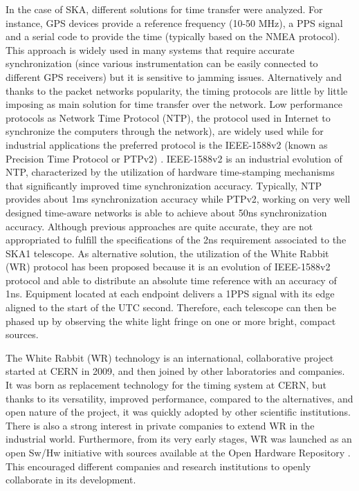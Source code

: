 In the case of SKA, different solutions for time transfer were analyzed. For instance, GPS devices provide a reference frequency (10-50 MHz), a PPS signal and a serial code to provide the time (typically based on the NMEA protocol). This approach is widely used in many systems that require accurate synchronization (since various instrumentation can be easily connected to different GPS receivers) but it is sensitive to jamming issues. Alternatively and thanks to the packet networks popularity, the timing protocols are little by little imposing as main solution for time transfer over the network. Low performance protocols as Network Time Protocol (NTP), the protocol used in Internet to synchronize the computers through the network), \cite{ntf:ntp_std} are widely used while for industrial applications the preferred protocol is the IEEE-1588v2 (known as Precision Time Protocol or PTPv2) \cite{ieee:ieee1588_std} \cite{itu:TG8275_1_Y_1369_1}. IEEE-1588v2 is an industrial evolution of NTP, characterized by the utilization of hardware time-stamping mechanisms that significantly improved time synchronization accuracy. Typically, NTP provides about 1ms synchronization accuracy while PTPv2, working on very well designed time-awa\textsf{}re networks is able to achieve about 50ns synchronization accuracy. 
Although previous approaches are quite accurate, they are not appropriated to fulfill the specifications of the 2ns requirement associated to the SKA1 telescope. As alternative solution, the utilization of the White Rabbit (WR) protocol has been proposed because it is an evolution of IEEE-1588v2 protocol and able to distribute an absolute time reference with an accuracy of 1ns. Equipment located at each endpoint delivers a 1PPS signal with its edge aligned to the start of the UTC second. Therefore, each telescope can then be phased up by observing the white light fringe on one or more bright, compact sources.

The White Rabbit (WR) technology is an international, collaborative project started at CERN in 2009, and then joined by other laboratories and companies. It was born as replacement technology for the timing system at CERN, but thanks to its versatility, improved performance, compared to the alternatives, and open nature of the project, it was quickly adopted by other scientific institutions. There is also a strong interest in private companies to extend WR in the   industrial world. Furthermore, from its very early stages, WR was launched as an open Sw/Hw initiative with sources available at the Open Hardware Repository \cite{ohwr:repo}. This encouraged different companies and research institutions to openly collaborate in its development.

